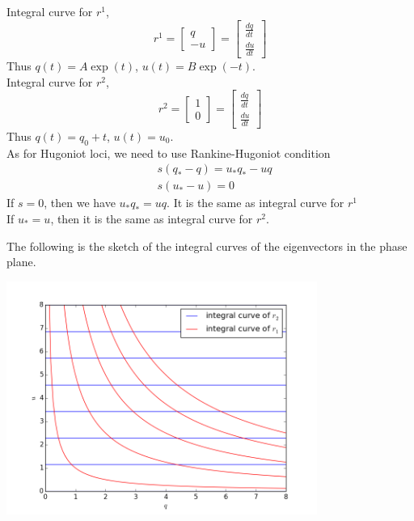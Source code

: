 \documentclass[11pt]{article}
\begin{document}
\begin{enumerate}
\begin{enumerate}
        		Integral curve for $r^1$,
        		\[
        		r^1=\begin{bmatrix}q\\ -u\end{bmatrix}=
        		\begin{bmatrix}\frac{dq}{dt}\\ \frac{du}{dt}\end{bmatrix}
        		\]
        		Thus $q(t)=A\exp(t)$, $u(t)=B\exp(-t)$.\\
        		
        		Integral curve for $r^2$,
        		\[
        		r^2=\begin{bmatrix}1\\ 0\end{bmatrix}=
        		\begin{bmatrix}\frac{dq}{dt}\\ \frac{du}{dt}\end{bmatrix}
        		\]
        		Thus $q(t)=q_0+t$, $u(t)=u_0$.\\
        		
        		As for Hugoniot loci, we need to use Rankine-Hugoniot condition
        		\begin{align*}
        		&s(q_*-q)=u_*q_*-uq\\
        		&s(u_*-u)=0
        		\end{align*}
        		If $s=0$, then we have $u_*q_*=uq$. It is the same as integral curve for $r^1$\\
        		If $u_*=u$, then it is the same as integral curve for $r^2$.
        		
        		The following is the sketch of the integral curves of the eigenvectors in the phase plane.
        							
					\hfil\includegraphics[width=4.0in]{problem_3b_integral.png}\hfill


\end{enumerate}
\end{enumerate}
\end{document}
